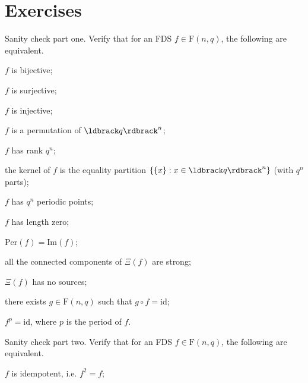 \documentclass[a4paper, 11pt]{book}
\numberwithin{equation}{section}
\theoremstyle{plain}
\newcommand{\graph}{\Xi}
\newcommand{\functions}{\mathrm{F}}
\newcommand{\image}{\mathrm{Im}}
\newcommand{\periodic}{\mathrm{Per}}
\newcommand{\id}{\mathrm{id}}
\renewcommand{\(}{\ldbrack}
\renewcommand{\)}{\rdbrack}
\begin{document}
\section{Exercises} \label{sec:ch1_exercises}

\begin{exercises}



\item Sanity check part one. Verify that for an FDS $f \in \functions(n,q)$, the following are equivalent.
\begin{exercises}
	\item $f$ is bijective;
	
	\item $f$ is surjective;
	
	\item $f$ is injective;
	
	\item $f$ is a permutation of $\(q\)^n$;
	
	\item $f$ has rank $q^n$;
	
	\item the kernel of $f$ is the equality partition $\{ \{x\} : x \in \(q\)^n \}$  (with $q^n$ parts);
	
	\item $f$ has $q^n$ periodic points;
	
	\item $f$ has length zero;
	
	\item $\periodic(f) = \image(f)$;
	
	\item all the connected components of $\graph(f)$ are strong;
	
	\item $\graph(f)$ has no sources;
	
	\item there exists $g \in \functions(n, q)$ such that $g \circ f = \id$;
	
	\item $f^p = \id$, where $p$ is the period of $f$.
\end{exercises}


\item Sanity check part two. Verify that for an FDS $f \in \functions(n,q)$, the following are equivalent.
\begin{exercises}
	\item $f$ is idempotent, i.e. $f^2 = f$;


\end{exercises}
\end{exercises}
\end{document}
